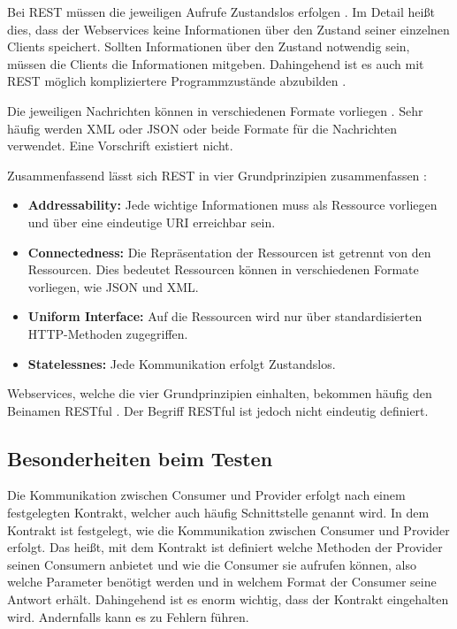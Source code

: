 \documentclass{llncs}
\begin{document}
Bei REST müssen die jeweiligen Aufrufe Zustandslos erfolgen \cite{reza2010framework, porres2011modeling, kao2013performance}. Im Detail heißt dies, dass der Webservices keine Informationen über den Zustand seiner einzelnen Clients speichert. Sollten Informationen über den Zustand notwendig sein, müssen die Clients die Informationen mitgeben. Dahingehend ist es auch mit REST möglich kompliziertere Programmzustände abzubilden \cite{porres2011modeling}.

Die jeweiligen Nachrichten können in verschiedenen Formate vorliegen
\cite{reza2010framework}. Sehr häufig werden XML oder JSON oder beide Formate für die Nachrichten verwendet. 
Eine Vorschrift existiert nicht.

Zusammenfassend lässt sich REST in vier Grundprinzipien zusammenfassen \citep{porres2011modeling}: 

\begin{itemize}
\item \textbf{Addressability: } Jede wichtige Informationen muss als Ressource vorliegen und über eine eindeutige URI erreichbar sein.
\item \textbf{Connectedness: } Die Repräsentation der Ressourcen ist getrennt von den Ressourcen. Dies bedeutet Ressourcen können in verschiedenen Formate vorliegen, wie JSON und XML.
\item \textbf{Uniform Interface: } Auf die Ressourcen wird nur über standardisierten HTTP-Methoden zugegriffen.
\item \textbf{Statelessnes: } Jede Kommunikation erfolgt Zustandslos.
\end{itemize}

Webservices, welche die vier Grundprinzipien einhalten, bekommen häufig den Beinamen RESTful \citep{porres2011modeling}. Der Begriff RESTful ist jedoch nicht eindeutig definiert.  

\subsection{Besonderheiten beim Testen}
Die Kommunikation zwischen Consumer und Provider erfolgt nach einem festgelegten Kontrakt, welcher auch häufig Schnittstelle genannt wird. In dem Kontrakt ist festgelegt, wie die Kommunikation zwischen Consumer und Provider erfolgt. Das heißt, mit dem Kontrakt ist definiert welche Methoden der Provider seinen Consumern anbietet und wie die Consumer sie aufrufen können, also welche Parameter benötigt werden und in welchem Format der Consumer seine Antwort erhält. Dahingehend ist es enorm wichtig, dass der Kontrakt eingehalten wird. Andernfalls kann es zu Fehlern führen.
\end{document}
